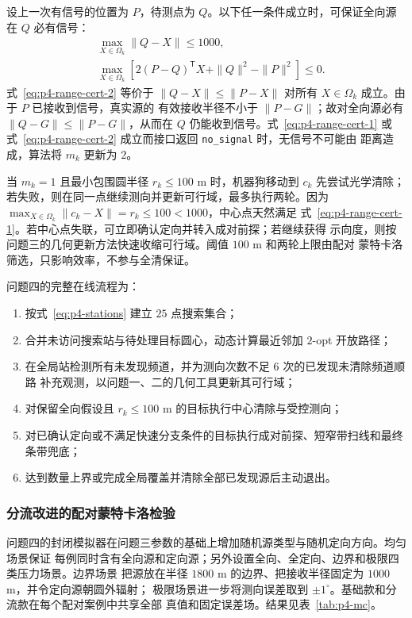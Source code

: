 设上一次有信号的位置为 $P$，待测点为 $Q$。以下任一条件成立时，可保证全向源在 $Q$
必有信号：
\begin{align}
&\max_{X\in\Omega_k}\|Q-X\|\le1000, 
\label{eq:p4-range-cert-1}\\
&\max_{X\in\Omega_k}
\left[2(P-Q)^{\mathsf T}X+\|Q\|^2-\|P\|^2\right]\le0.
\label{eq:p4-range-cert-2}
\end{align}
式~\eqref{eq:p4-range-cert-2} 等价于
$\|Q-X\|\le\|P-X\|$ 对所有 $X\in\Omega_k$ 成立。由于 $P$ 已接收到信号，真实源的
有效接收半径不小于 $\|P-G\|$；故对全向源必有
$\|Q-G\|\le\|P-G\|$，从而在 $Q$ 仍能收到信号。式~\eqref{eq:p4-range-cert-1} 或
式~\eqref{eq:p4-range-cert-2} 成立而接口返回 \texttt{no\_signal} 时，无信号不可能由
距离造成，算法将 $m_k$ 更新为 $2$。

当 $m_k=1$ 且最小包围圆半径 $r_k\le100$ m 时，机器狗移动到 $c_k$ 先尝试光学清除；
若失败，则在同一点继续测向并更新可行域，最多执行两轮。因为
$\max_{X\in\Omega_k}\|c_k-X\|=r_k\le100<1000$，中心点天然满足
式~\eqref{eq:p4-range-cert-1}。若中心点失联，可立即确认定向并转入成对前探；若继续获得
示向度，则按问题三的几何更新方法快速收缩可行域。阈值 $100$ m 和两轮上限由配对
蒙特卡洛筛选，只影响效率，不参与全清保证。


问题四的完整在线流程为：
\begin{enumerate}
    \item 按式~\eqref{eq:p4-stations} 建立 $25$ 点搜索集合；
    \item 合并未访问搜索站与待处理目标圆心，动态计算最近邻加 $2$-opt 开放路径；
    \item 在全局站检测所有未发现频道，并为测向次数不足 $6$ 次的已发现未清除频道顺路
    补充观测，以问题一、二的几何工具更新其可行域；
    \item 对保留全向假设且 $r_k\le100$ m 的目标执行中心清除与受控测向；
    \item 对已确认定向或不满足快速分支条件的目标执行成对前探、短窄带扫线和最终条带兜底；
    \item 达到数量上界或完成全局覆盖并清除全部已发现源后主动退出。
\end{enumerate}

\subsubsection{分流改进的配对蒙特卡洛检验}

问题四的封闭模拟器在问题三参数的基础上增加随机源类型与随机定向方向。均匀场景保证
每例同时含有全向源和定向源；另外设置全向、全定向、边界和极限四类压力场景。边界场景
把源放在半径 $1800$ m 的边界、把接收半径固定为 $1000$ m，并令定向源朝圆外辐射；
极限场景进一步将测向误差取到 $\pm1^\circ$。基础款和分流款在每个配对案例中共享全部
真值和固定误差场。结果见表~\ref{tab:p4-mc}。


